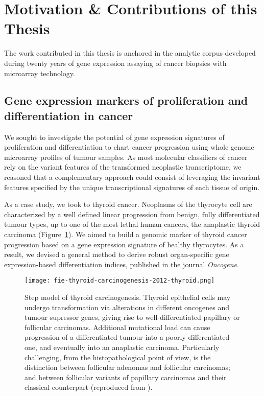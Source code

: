 \section{Motivation \& Contributions of this Thesis}

The work contributed in this thesis is anchored in the analytic corpus developed
during twenty years of gene expression assaying of cancer biopsies with
microarray technology.  %

\subsection{Gene expression markers of proliferation and
  differentiation in cancer}
We sought to investigate the potential of gene expression signatures of
proliferation and differentiation to chart cancer progression using whole genome
microarray profiles of tumour samples.  As most molecular classifiers of cancer
rely on the variant features of the transformed neoplastic transcriptome, we
reasoned that a complementary approach could consist of leveraging the invariant
features specified by the unique transcriptional signatures of each tissue of
origin.

As a case study, we took to thyroid cancer.  Neoplasms of the thyrocyte cell are
characterized by a well defined linear progression from benign, fully
differentiated tumour types, up to one of the most lethal human cancers, the
anaplastic thyroid carcinoma (Figure~\ref{fig:thyroid-carcinogenesis}).  We
aimed to build a genomic marker of thyroid cancer progression based on a gene
expression signature of healthy thyrocytes.  As a result, we devised a general
method to derive robust \mbox{organ-specific} gene \mbox{expression-based}
differentiation indices, published in the journal
\emph{Oncogene}.\cite{tomas_general_2012}

\begin{figure}[ht]
  \texttt{[image: fie-thyroid-carcinogenesis-2012-thyroid.png]}%
  \caption[Step model of thyroid carcinogenesis]{Step model of thyroid
    carcinogenesis.  Thyroid epithelial cells may undergo transformation via
    alterations in different oncogenes and tumour supressor genes, giving rise
    to \mbox{well-differentiated} papillary or follicular carcinomas.
    Additional mutational load can cause progression of a differentiated tumour
    into a poorly differentiated one, and eventually into an anaplastic
    carcinoma.  Particularly challenging, from the histopathological point of
    view, is the distinction between follicular adenomas and follicular
    carcinomas; and between follicular variants of papillary carcinomas and
    their classical counterpart (reproduced from
    \citealp{sastre-perona_role_2012}).}
  \label{fig:thyroid-carcinogenesis}
\end{figure}

